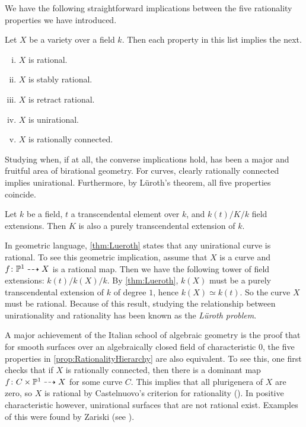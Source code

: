 We have the following straightforward implications between the five rationality properties we have introduced.
\begin{proposition}
	\label{prop:RationalityHierarchy}
	Let $X$ be a variety over a field $k$. Then each property in this list implies the next. %
	\begin{enumerate}[i)]
		\item $X$ is rational.
		\item $X$ is stably rational.
		\item $X$ is retract rational.
		\item $X$ is unirational.
		\item $X$ is rationally connected.
	\end{enumerate}
\end{proposition}
Studying when, if at all, the converse implications hold, has been a major and fruitful area of birational geometry. For curves, clearly rationally connected implies unirational. Furthermore, by Lüroth's theorem, all five properties coincide.
\begin{theorem}[{Lüroth's theorem (\cite[Example 2.55]{Hartshorne})}] %
	\label{thm:Lueroth}
	Let $k$ be a field, $t$ a transcendental element over $k$, and $k(t)/K/k$ field extensions. Then $K$ is also a purely transcendental extension of $k$.
\end{theorem}
In geometric language, \cref{thm:Lueroth} states that any unirational curve is rational. To see this geometric implication, assume that $X$ is a curve and $f \colon \mathbb{P}^1 \dashrightarrow X$ is a rational map. Then we have the following tower of field extensions: $k(t)/k(X)/k$. By \cref{thm:Lueroth}, $k(X)$ must be a purely transcendental extension of $k$ of degree $1$, hence $k(X) \simeq k(t)$. So the curve $X$ must be rational. Because of this result, studying the relationship between unirationality and rationality has been known as the \emph{Lüroth problem}.

A major achievement of the Italian school of algebraic geometry is the proof that for smooth surfaces over an algebraically closed field of characteristic 0, the five properties in \cref{prop:RationalityHierarchy} are also equivalent. To see this, one first checks that if $X$ is rationally connected, then there is a dominant map $f \colon C \times \mathbb{P}^1 \dashrightarrow X$ for some curve $C$. This implies that all plurigenera of $X$ are zero, so $X$ is rational by Castelnuovo's criterion for rationality (\cite[V.6.2]{Hartshorne}). In positive characteristic however, unirational surfaces that are not rational exist. Examples of this were found by Zariski (see \cite{Zariski58}).

